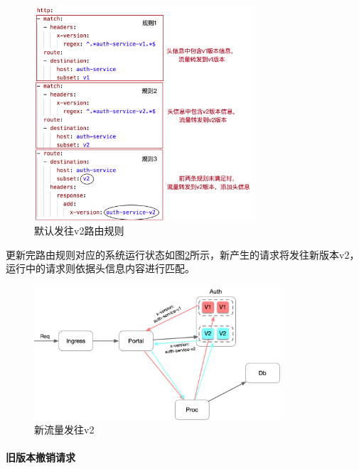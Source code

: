 \documentclass[a4paper, 12pt]{article}
\theoremstyle{definition}
\begin{document}
\begin{figure}[!ht]
 \centering
 \includegraphics[height=8cm]{images/vs_default_v2.png}
 \caption{默认发往v2路由规则}
 \label{fig:vs_default_v2}
\end{figure}

更新完路由规则对应的系统运行状态如图\ref{fig:traffic_v1v2}所示，新产生的请求将发往新版本v2，运行中的请求则依据头信息内容进行匹配。
\begin{figure}[!ht]
 \centering
 \includegraphics[height=5cm]{images/traffic_v1v2.png}
 \caption{新流量发往v2}
 \label{fig:traffic_v1v2}
\end{figure}

\paragraph{旧版本撤销请求}\mbox{}\\
\end{document}
